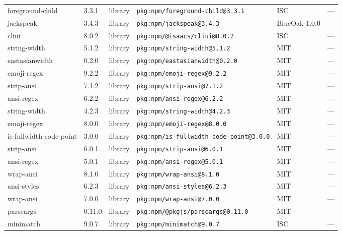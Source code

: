 \documentclass[11pt,a4paper]{article}
\begin{document}
\begin{longtable}{|p{4cm}|p{2cm}|p{1.6cm}|p{5cm}|p{1.5cm}|p{3.5cm}|}
\raggedright foreground-child & 3.3.1 & library & \small\texttt{pkg:npm/foreground-child@3.3.1} & ISC & \small — \\
\raggedright jackspeak & 3.4.3 & library & \small\texttt{pkg:npm/jackspeak@3.4.3} & BlueOak-1.0.0 & \small — \\
\raggedright cliui & 8.0.2 & library & \small\texttt{pkg:npm/@isaacs/cliui@8.0.2} & ISC & \small — \\
\raggedright string-width & 5.1.2 & library & \small\texttt{pkg:npm/string-width@5.1.2} & MIT & \small — \\
\raggedright eastasianwidth & 0.2.0 & library & \small\texttt{pkg:npm/eastasianwidth@0.2.0} & MIT & \small — \\
\raggedright emoji-regex & 9.2.2 & library & \small\texttt{pkg:npm/emoji-regex@9.2.2} & MIT & \small — \\
\raggedright strip-ansi & 7.1.2 & library & \small\texttt{pkg:npm/strip-ansi@7.1.2} & MIT & \small — \\
\raggedright ansi-regex & 6.2.2 & library & \small\texttt{pkg:npm/ansi-regex@6.2.2} & MIT & \small — \\
\raggedright string-width & 4.2.3 & library & \small\texttt{pkg:npm/string-width@4.2.3} & MIT & \small — \\
\raggedright emoji-regex & 8.0.0 & library & \small\texttt{pkg:npm/emoji-regex@8.0.0} & MIT & \small — \\
\raggedright is-fullwidth-code-point & 3.0.0 & library & \small\texttt{pkg:npm/is-fullwidth-code-point@3.0.0} & MIT & \small — \\
\raggedright strip-ansi & 6.0.1 & library & \small\texttt{pkg:npm/strip-ansi@6.0.1} & MIT & \small — \\
\raggedright ansi-regex & 5.0.1 & library & \small\texttt{pkg:npm/ansi-regex@5.0.1} & MIT & \small — \\
\raggedright wrap-ansi & 8.1.0 & library & \small\texttt{pkg:npm/wrap-ansi@8.1.0} & MIT & \small — \\
\raggedright ansi-styles & 6.2.3 & library & \small\texttt{pkg:npm/ansi-styles@6.2.3} & MIT & \small — \\
\raggedright wrap-ansi & 7.0.0 & library & \small\texttt{pkg:npm/wrap-ansi@7.0.0} & MIT & \small — \\
\raggedright parseargs & 0.11.0 & library & \small\texttt{pkg:npm/@pkgjs/parseargs@0.11.0} & MIT & \small — \\
\raggedright minimatch & 9.0.7 & library & \small\texttt{pkg:npm/minimatch@9.0.7} & ISC & \small — \\

\end{longtable}
\end{document}
